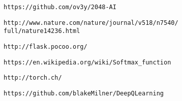 \documentclass[9pt,twocolumn]{article}
\begin{document}
\begin{thebibliography}{9}

 \texttt{https://github.com/ov3y/2048-AI}

 \texttt{http://www.nature.com/nature/journal/v518/n7540/\\full/nature14236.html}

 \texttt{http://flask.pocoo.org/}

 \texttt{https://en.wikipedia.org/wiki/Softmax\_function}

 \texttt{http://torch.ch/}

 \texttt{https://github.com/blakeMilner/DeepQLearning}

\end{thebibliography}
\end{document}
